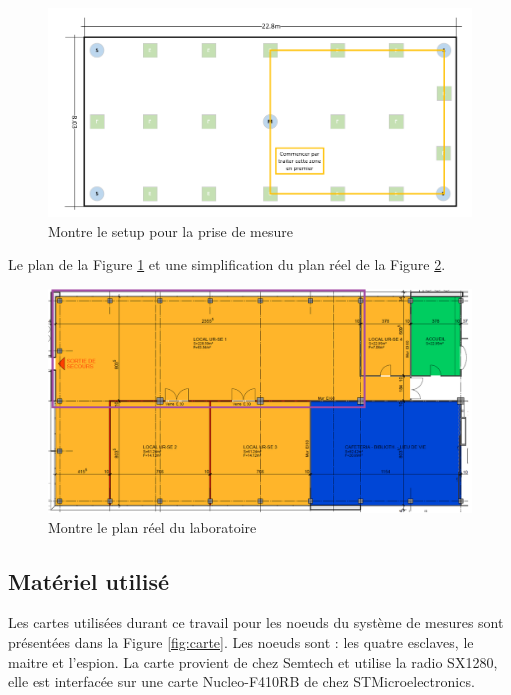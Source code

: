 \begin{figure}[htp]
 \begin{center}
  \includegraphics[scale=0.5]{figures/PlanMod.PNG}
  \caption{Montre le setup pour la prise de mesure}
  \label{fig:PlanMod} %
 \end{center}
\end{figure}

Le plan de la Figure \ref{fig:PlanMod} et une simplification du plan réel de la Figure \ref{fig:PlanRe}.

\begin{figure}[htp]
 \begin{center}
  \includegraphics[scale=0.5]{figures/PlanRe.PNG}
  \caption{Montre le plan réel du laboratoire}
  \label{fig:PlanRe} %
 \end{center}
\end{figure}

\subsection{Matériel utilisé}
Les cartes utilisées durant ce travail pour les noeuds du système de mesures sont présentées dans la Figure \ref{fig:carte}. Les noeuds sont : les quatre esclaves, le maitre et l'espion. La carte provient de chez Semtech et utilise la radio SX1280, elle est interfacée sur une carte Nucleo-F410RB de chez STMicroelectronics.
 
